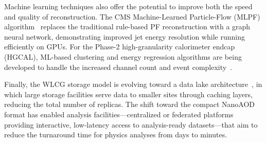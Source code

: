 Machine learning techniques also offer the potential to improve both the speed and quality of reconstruction. The CMS Machine-Learned Particle-Flow (MLPF) algorithm~\cite{CMS:2026mlpf} replaces the traditional rule-based PF reconstruction with a graph neural network, demonstrating improved jet energy resolution while running efficiently on GPUs. For the Phase-2 high-granularity calorimeter endcap (HGCAL), ML-based clustering and energy regression algorithms are being developed to handle the increased channel count and event complexity~\cite{CMS:2025phase2}.

Finally, the WLCG storage model is evolving toward a data lake architecture~\cite{Bird:2019datalake}, in which large storage facilities serve data to smaller sites through caching layers, reducing the total number of replicas. The shift toward the compact NanoAOD format has enabled analysis facilities---centralized or federated platforms providing interactive, low-latency access to analysis-ready datasets---that aim to reduce the turnaround time for physics analyses from days to minutes.

